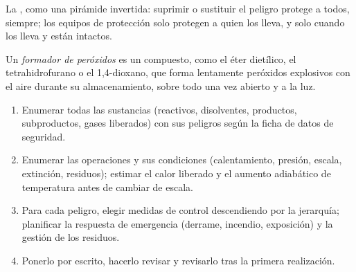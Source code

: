 \begin{omfigure}

{\small La , como una pirámide invertida: suprimir o sustituir
el peligro protege a todos, siempre; los equipos de protección solo protegen a quien
los lleva, y solo cuando los lleva y están intactos.}
\end{omfigure}

\begin{definition}\label{def:b3:lab-techniques-3:peroxide}
Un \emph{formador de peróxidos} es un compuesto, como el éter
dietílico, el tetrahidrofurano o el 1,4-dioxano, que forma lentamente peróxidos explosivos
con el aire durante su almacenamiento, sobre todo una vez abierto y a la luz.
\end{definition}

\begin{method}\label{met:b3:lab-techniques-3:risk-assessment}
\begin{enumerate}
  \item Enumerar todas las sustancias (reactivos, disolventes, productos, subproductos, gases
        liberados) con sus peligros según la ficha de datos de seguridad.
  \item Enumerar las operaciones y sus condiciones (calentamiento, presión, escala,
        extinción, residuos); estimar el calor liberado y el aumento adiabático de temperatura
        antes de cambiar de escala.
  \item Para cada peligro, elegir medidas de control descendiendo por la jerarquía; planificar la respuesta
        de emergencia (derrame, incendio, exposición) y la gestión de los residuos.
  \item Ponerlo por escrito, hacerlo revisar y revisarlo tras la primera realización.
\end{enumerate}
\end{method}

